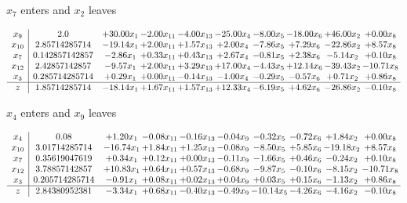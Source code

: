 \documentclass[9pt]{article}
\begin{document}
 $ x_{7} $ enters and $ x_{2} $ leaves 

 \[\begin{array}{c| c c@{\hskip 2pt} c@{\hskip 2pt} c@{\hskip 2pt} c@{\hskip 2pt} c@{\hskip 2pt} c@{\hskip 2pt} c@{\hskip 2pt} c@{\hskip 2pt} }
 x_{9}   &  2.0 & + 30.00 x_{1} & -2.00 x_{11} & -4.00 x_{13} & -25.00 x_{4} & -8.00 x_{5} & -18.00 x_{6} & + 46.00 x_{2} & +  0.00 x_{8}\\
 x_{10}   &  2.85714285714 & -19.14 x_{1} & +  2.00 x_{11} & +  1.57 x_{13} & +  2.00 x_{4} & -7.86 x_{5} & +  7.29 x_{6} & -22.86 x_{2} & +  8.57 x_{8}\\
 x_{7}   &  0.142857142857 & -2.86 x_{1} & +  0.33 x_{11} & +  0.43 x_{13} & +  2.67 x_{4} & -0.81 x_{5} & +  2.38 x_{6} & -5.14 x_{2} & +  0.10 x_{8}\\
 x_{12}   &  2.42857142857 & -9.57 x_{1} & +  2.00 x_{11} & +  3.29 x_{13} & + 17.00 x_{4} & -4.43 x_{5} & + 12.14 x_{6} & -39.43 x_{2} & -10.71 x_{8}\\
 x_{3}   &  0.285714285714 & +  0.29 x_{1} & +  0.00 x_{11} & -0.14 x_{13} & -1.00 x_{4} & -0.29 x_{5} & -0.57 x_{6} & +  0.71 x_{2} & +  0.86 x_{8}\\
\hline
z    &  1.85714285714 & -18.14 x_{1} & +  1.67 x_{11} & +  1.57 x_{13} & + 12.33 x_{4} & -6.19 x_{5} & +  4.62 x_{6} & -26.86 x_{2} & -0.10 x_{8}\\
\end{array}\]


 $ x_{4} $ enters and $ x_{9} $ leaves 

 \[\begin{array}{c| c c@{\hskip 2pt} c@{\hskip 2pt} c@{\hskip 2pt} c@{\hskip 2pt} c@{\hskip 2pt} c@{\hskip 2pt} c@{\hskip 2pt} c@{\hskip 2pt} }
 x_{4}   &  0.08 & +  1.20 x_{1} & -0.08 x_{11} & -0.16 x_{13} & -0.04 x_{9} & -0.32 x_{5} & -0.72 x_{6} & +  1.84 x_{2} & +  0.00 x_{8}\\
 x_{10}   &  3.01714285714 & -16.74 x_{1} & +  1.84 x_{11} & +  1.25 x_{13} & -0.08 x_{9} & -8.50 x_{5} & +  5.85 x_{6} & -19.18 x_{2} & +  8.57 x_{8}\\
 x_{7}   &  0.35619047619 & +  0.34 x_{1} & +  0.12 x_{11} & +  0.00 x_{13} & -0.11 x_{9} & -1.66 x_{5} & +  0.46 x_{6} & -0.24 x_{2} & +  0.10 x_{8}\\
 x_{12}   &  3.78857142857 & + 10.83 x_{1} & +  0.64 x_{11} & +  0.57 x_{13} & -0.68 x_{9} & -9.87 x_{5} & -0.10 x_{6} & -8.15 x_{2} & -10.71 x_{8}\\
 x_{3}   &  0.205714285714 & -0.91 x_{1} & +  0.08 x_{11} & +  0.02 x_{13} & +  0.04 x_{9} & +  0.03 x_{5} & +  0.15 x_{6} & -1.13 x_{2} & +  0.86 x_{8}\\
\hline
z    &  2.84380952381 & -3.34 x_{1} & +  0.68 x_{11} & -0.40 x_{13} & -0.49 x_{9} & -10.14 x_{5} & -4.26 x_{6} & -4.16 x_{2} & -0.10 x_{8}\\
\end{array}\]
\end{document}
